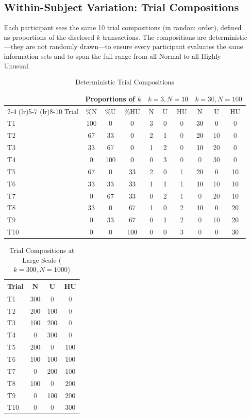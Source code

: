 \documentclass[12pt]{article}
\theoremstyle{definition}
\begin{document}
\subsection{Within-Subject Variation: Trial Compositions}
\label{sec:within}

Each participant sees the same 10 trial compositions (in random order), defined as proportions of the disclosed $k$ transactions. The compositions are deterministic---they are not randomly drawn---to ensure every participant evaluates the same information sets and to span the full range from all-Normal to all-Highly Unusual.

\begin{table}[h!]
\centering
\caption{Deterministic Trial Compositions}
\label{tab:compositions}
\small
\begin{tabular}{l ccc ccc ccc}
\toprule
& \multicolumn{3}{c}{Proportions of $k$} & \multicolumn{3}{c}{$k=3, N=10$} & \multicolumn{3}{c}{$k=30, N=100$} \\
\cmidrule(lr){2-4} \cmidrule(lr){5-7} \cmidrule(lr){8-10}
Trial & \%N & \%U & \%HU & N & U & HU & N & U & HU \\
\midrule
T1  & 100 &   0 &   0 & 3 & 0 & 0 & 30 &  0 &  0 \\
T2  &  67 &  33 &   0 & 2 & 1 & 0 & 20 & 10 &  0 \\
T3  &  33 &  67 &   0 & 1 & 2 & 0 & 10 & 20 &  0 \\
T4  &   0 & 100 &   0 & 0 & 3 & 0 &  0 & 30 &  0 \\
T5  &  67 &   0 &  33 & 2 & 0 & 1 & 20 &  0 & 10 \\
T6  &  33 &  33 &  33 & 1 & 1 & 1 & 10 & 10 & 10 \\
T7  &   0 &  67 &  33 & 0 & 2 & 1 &  0 & 20 & 10 \\
T8  &  33 &   0 &  67 & 1 & 0 & 2 & 10 &  0 & 20 \\
T9  &   0 &  33 &  67 & 0 & 1 & 2 &  0 & 10 & 20 \\
T10 &   0 &   0 & 100 & 0 & 0 & 3 &  0 &  0 & 30 \\
\bottomrule
\end{tabular}
\end{table}

\begin{table}[h!]
\centering
\caption{Trial Compositions at Large Scale ($k=300, N=1000$)}
\label{tab:compositions_large}
\begin{tabular}{l ccc}
\toprule
Trial & N & U & HU \\
\midrule
T1  & 300 &   0 &   0 \\
T2  & 200 & 100 &   0 \\
T3  & 100 & 200 &   0 \\
T4  &   0 & 300 &   0 \\
T5  & 200 &   0 & 100 \\
T6  & 100 & 100 & 100 \\
T7  &   0 & 200 & 100 \\
T8  & 100 &   0 & 200 \\
T9  &   0 & 100 & 200 \\
T10 &   0 &   0 & 300 \\
\bottomrule
\end{tabular}
\end{table}
\end{document}
